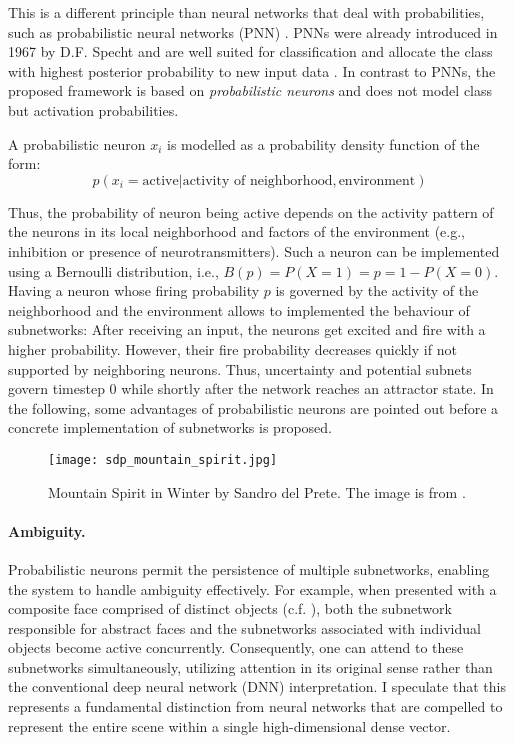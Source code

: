 This is a different principle than neural networks that deal with probabilities, such as probabilistic neural networks (PNN) . PNNs were already introduced in 1967 by D.F. Specht \cite{Specht_1967, Specht_1990} and are well suited for classification and allocate the class with highest posterior probability to new input data \cite{Zeinali_Story_2017}.
In contrast to PNNs, the proposed framework is based on \emph{probabilistic neurons} and does not model class but activation probabilities.

A probabilistic neuron $x_i$ is modelled as a probability density function of the form:
\begin{equation}
    p(x_i = \text{active} | \text{activity of neighborhood}, \text{environment}) 
\end{equation}

Thus, the probability of neuron being active depends on the activity pattern of the neurons in its local neighborhood and factors of the environment (e.g., inhibition or presence of neurotransmitters).
Such a neuron can be implemented using a Bernoulli distribution, i.e., $B(p) = P(X = 1) = p = 1 - P(X=0)$. Having a neuron whose firing probability $p$ is governed by the activity of the neighborhood and the environment allows to implemented the behaviour of subnetworks: After receiving an input, the neurons get excited and fire with a higher probability. However, their fire probability decreases quickly if not supported by neighboring neurons. Thus, uncertainty and potential subnets govern timestep 0 while shortly after the network reaches an attractor state. In the following, some advantages of probabilistic neurons are pointed out before a concrete implementation of subnetworks is proposed.


\begin{figure}[h]
    \centering
    \texttt{[image: sdp\_mountain\_spirit.jpg]}
    \caption[Mountain Spirit in Winter by Sandro del Prete]{Mountain Spirit in Winter by Sandro del Prete. The image is from .}
\end{figure}


\paragraph{Ambiguity.} Probabilistic neurons permit the persistence of multiple subnetworks, enabling the system to handle ambiguity effectively. For example, when presented with a composite face comprised of distinct objects (c.f. ), both the subnetwork responsible for abstract faces and the subnetworks associated with individual objects become active concurrently. Consequently, one can attend to these subnetworks simultaneously, utilizing attention in its original sense rather than the conventional deep neural network (DNN) interpretation. I speculate that this represents a fundamental distinction from neural networks that are compelled to represent the entire scene within a single high-dimensional dense vector.

